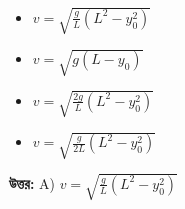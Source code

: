 \documentclass[12pt, a4paper]{article}
\begin{document}
\begin{itemize}[label={}, leftmargin=1cm, itemsep=0.5em]
    \item[\textbf{A)}]  $v = \sqrt{\frac{g}{L} (L^2 - y_0^2)}$
    \item[\textbf{B)}] $v = \sqrt{g (L - y_0)}$
    \item[\textbf{C)}]  $v = \sqrt{\frac{2g}{L} (L^2 - y_0^2)}$
    \item[\textbf{D)}]  $v = \sqrt{\frac{g}{2L} (L^2 - y_0^2)}$
\end{itemize}

\vspace{0.5em}
\begin{tcolorbox}[answerbox]
    \textbf{\color{success} উত্তর:} A) $v = \sqrt{\frac{g}{L} (L^2 - y_0^2)}$
\end{tcolorbox}
\vspace{1em}
\end{document}
